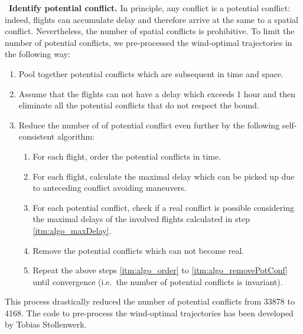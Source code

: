 \documentclass[9pt]{extarticle}
\begin{document}
\begin{changemargin}{0.5cm}{0cm}
\textbullet~\textbf{Identify potential conflict.} In principle, any conflict is a potential conflict: indeed, flights can accumulate delay
and therefore arrive at the same to a spatial conflict. Nevertheless, the number of spatial conflicts is prohibitive. To limit the number
of potential conflicts, we pre-processed the wind-optimal trajectories in the following way:
\begin{enumerate}
    \item Pool together potential conflicts which are subsequent in time and space.
    \item Assume that the flights can not have a delay which exceeds 1 hour and then eliminate all the potential conflicts that do not respect the bound.
    \item Reduce the number of of potential conflict even further by the following self-consistent algorithm:
    \begin{enumerate}
        \item \label{itm:algo_order}For each flight, order the potential conflicts in time.
        \item \label{itm:algo_maxDelay} For each flight, calculate the maximal delay which can be picked up due to anteceding conflict avoiding maneuvers.
        \item \label{itm:algo_potConf}For each potential conflict, check if a real conflict is possible considering the maximal delays of the involved flights calculated in step \ref{itm:algo_maxDelay}.
        \item \label{itm:algo_removePotConf}Remove the potential conflicts which can not become real.
        \item Repeat the above steps \ref{itm:algo_order} to \ref{itm:algo_removePotConf} until convergence (i.e.\ the number of potential conflicts is invariant).
    \end{enumerate}
\end{enumerate}
This process drastically reduced the number of potential conflicts from
33878 to 4168.
The code to pre-process the wind-optimal trajectories has
been developed by Tobias Stollenwerk.
\end{changemargin}
\end{document}
